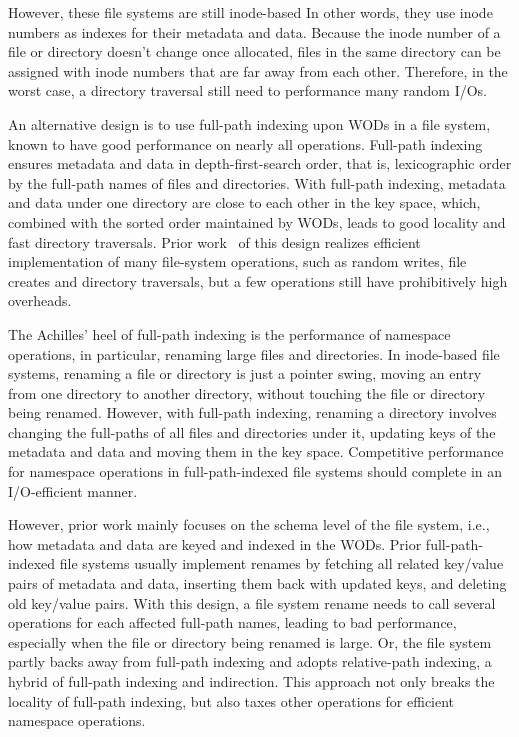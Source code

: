 However, these file systems are still inode-based
In other words, they use inode numbers as indexes for their metadata and data.
Because the inode number of a file or directory doesn't change once allocated,
files in the same directory can be assigned with inode numbers that
are far away from each other.
Therefore, in the worst case, a directory traversal still need to performance
many random I/Os.

An alternative design is to use full-path indexing upon WODs in a file system,
known to have good performance on nearly all operations.
Full-path indexing ensures metadata and data in depth-first-search order,
that is, lexicographic order by the full-path names of files and directories.
With full-path indexing, metadata and data under one directory are close to each
other in the key space, which, combined with the sorted order maintained by
WODs, leads to good locality and fast directory traversals.
Prior work~\citep{betrfs1,betrfs1tos,betrfs2,betrfs2tos,betrfs3} of this design
realizes efficient implementation of many file-system operations, such as random
writes, file creates and directory traversals,
but a few operations still have prohibitively high overheads.

The Achilles' heel of full-path indexing is the performance of namespace
operations, in particular, renaming large files and directories.
In inode-based file systems,
renaming a file or directory is just a pointer swing,
moving an entry from one directory to another directory,
without touching the file or directory being renamed.
However, with full-path indexing, renaming a directory involves changing the
full-paths of all files and directories under it,
updating keys of the metadata and data and moving them in the key space.
Competitive performance for namespace operations in full-path-indexed file
systems should complete in an I/O-efficient manner.

However, prior work mainly focuses on the schema level of the file system, i.e.,
how metadata and data are keyed and indexed in the WODs.
Prior full-path-indexed file systems usually implement renames by
fetching all related key/value pairs of metadata and data,
inserting them back with updated keys, and deleting old key/value pairs.
With this design, a file system rename needs to call several operations for each
affected full-path names, leading to bad performance,
especially when the file or directory being renamed is large.
Or, the file system partly backs away from full-path indexing and adopts
relative-path indexing, a hybrid of full-path indexing and indirection.
This approach not only breaks the locality of full-path indexing, but also
taxes other operations for efficient namespace operations.

